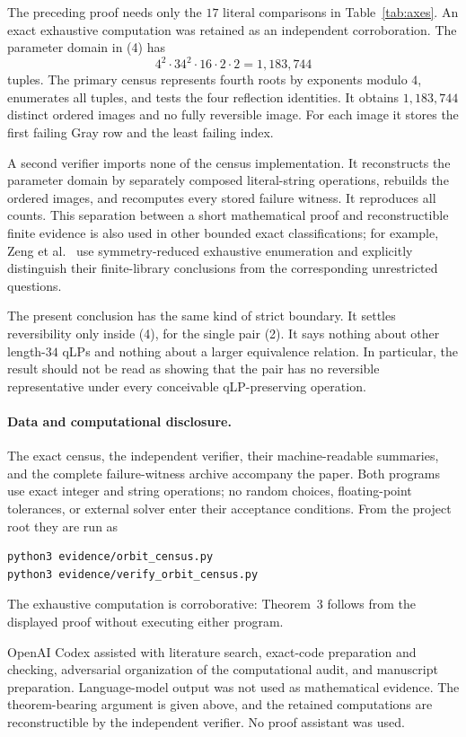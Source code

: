 \documentclass[11pt]{article}
\begin{document}
The preceding proof needs only the $17$ literal comparisons in
Table~\ref{tab:axes}.  An exact exhaustive computation was retained as an
independent corroboration.  The parameter domain in (4) has
\[
 4^2\cdot34^2\cdot16\cdot2\cdot2=1{,}183{,}744
 \tag{11}
\]
tuples.  The primary census represents fourth roots by exponents modulo $4$,
enumerates all tuples, and tests the four reflection identities.  It obtains
$1{,}183{,}744$ distinct ordered images and no fully reversible image.  For
each image it stores the first failing Gray row and the least failing index.

A second verifier imports none of the census implementation.  It reconstructs
the parameter domain by separately composed literal-string operations,
rebuilds the ordered images, and recomputes every stored failure witness.  It
reproduces all counts.  This separation between a short mathematical proof and
reconstructible finite evidence is also used in other bounded exact
classifications; for example, Zeng et al.~\cite{ZengEtAl2026Finite} use
symmetry-reduced exhaustive enumeration and explicitly distinguish their
finite-library conclusions from the corresponding unrestricted questions.

The present conclusion has the same kind of strict boundary.  It settles
reversibility only inside (4), for the single pair (2).  It says nothing about
other length-$34$ qLPs and nothing about a larger equivalence relation.  In
particular, the result should not be read as showing that the pair has no
reversible representative under every conceivable qLP-preserving operation.

\paragraph{Data and computational disclosure.}
The exact census, the independent verifier, their machine-readable summaries,
and the complete failure-witness archive accompany the paper.  Both programs
use exact integer and string operations; no random choices, floating-point
tolerances, or external solver enter their acceptance conditions.  From the
project root they are run as
\begin{verbatim}
python3 evidence/orbit_census.py
python3 evidence/verify_orbit_census.py
\end{verbatim}
The exhaustive computation is corroborative: Theorem~3 follows from the
displayed proof without executing either program.

OpenAI Codex assisted with literature search, exact-code preparation and
checking, adversarial organization of the computational audit, and manuscript
preparation.  Language-model output was not used as mathematical evidence.
The theorem-bearing argument is given above, and the retained computations are
reconstructible by the independent verifier.  No proof assistant was used.

\raggedright


\end{document}

